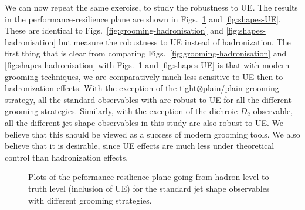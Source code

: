 \documentclass[11pt,letterpaper]{article}
\DeclareRobustCommand{\Figs}[2]{Figs.~\ref{#1} and \ref{#2}}
\begin{document}
We can now repeat the same exercise, to study the robustness to UE. The results in the performance-resilience plane are shown in \Figs{fig:grooming-UE}{fig:shapes-UE}. These are identical to \Figs{fig:grooming-hadronisation}{fig:shapes-hadronisation} but measure the robustness to UE instead of hadronization. The first thing that is clear from comparing \Figs{fig:grooming-hadronisation}{fig:shapes-hadronisation} with  \Figs{fig:grooming-UE}{fig:shapes-UE} is that with modern grooming techniques, we are comparatively much less sensitive to UE then to hadronization effects. With the exception of the tight$\otimes$plain/plain grooming strategy, all the standard observables with are robust to UE for all the different grooming strategies. Similarly, with the exception of the dichroic $D_2$ observable, all the different jet shape observables in this study are also robust to UE. We believe that this should be viewed as a success of modern grooming tools. We also believe that it is desirable, since UE effects are much less under theoretical control than hadronization effects. 

\begin{figure}
  \caption{Plots of the peformance-resilience plane going from hadron level to truth level (inclusion of UE) for the standard jet shape observables with different grooming strategies.}\label{fig:grooming-UE}
\end{figure}
\end{document}
